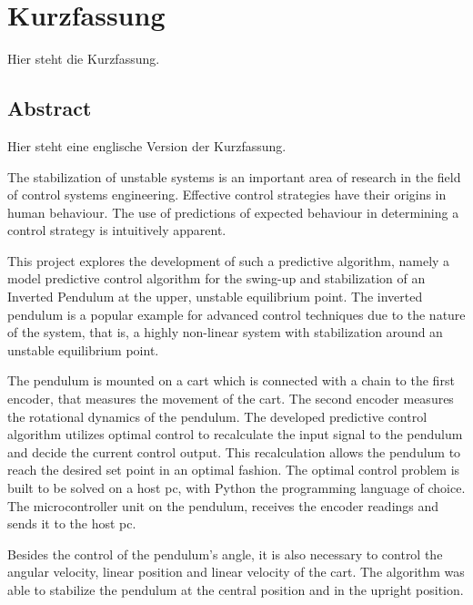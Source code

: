 
\ifinGerman

\newcommand{\abstracttitle}{Kurzfassung}

\else

\newcommand{\abstracttitle}{Abstract}

\fi

\chapter*{\abstracttitle}
\label{cha:abstract}

\ifinGerman

Hier steht die Kurzfassung.

\section*{\huge Abstract \normalsize}

Hier steht eine englische Version der Kurzfassung.

\else

The stabilization of unstable systems is an important area of research in the field of control systems engineering. Effective control strategies have their origins in human behaviour. The use of predictions of expected behaviour in determining a control strategy is intuitively apparent.

This project explores the development of such a predictive algorithm, namely a model predictive control algorithm for the swing-up and stabilization of an Inverted Pendulum at the upper, unstable equilibrium point.  The inverted pendulum is a popular example for advanced control techniques due to the nature of the system, that is, a highly non-linear system with stabilization around an unstable equilibrium
point.  

The pendulum is mounted on a cart which is connected with a chain to the first encoder, that measures the movement of the cart. The second encoder measures the rotational dynamics of the pendulum.
The developed predictive control algorithm utilizes optimal control to recalculate the input signal to the pendulum and decide the current control output. This recalculation allows the pendulum to reach the desired set point in an optimal fashion. The optimal control problem is built to be solved on a host pc, with Python the programming language of choice. The microcontroller unit on the pendulum, receives the encoder readings and sends it to the host pc. 

Besides the control of the pendulum's angle, it is also necessary to control the angular velocity, linear position and linear velocity of the cart. The algorithm was able to stabilize the pendulum at the central position and in the upright position. 


\fi

